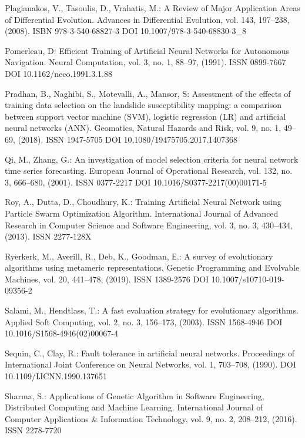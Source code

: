 \begin{thebibliography}{99.}
 Plagianakos, V., Tasoulis, D., Vrahatis, M.: A Review of Major Application Areas of Differential Evolution. Advances in Differential Evolution, vol. 143, 197--238, (2008). ISBN 978-3-540-68827-3 DOI 10.1007/978-3-540-68830-3\_8

 Pomerleau, D: Efficient Training of Artificial Neural Networks for Autonomous Navigation. Neural Computation, vol. 3, no. 1, 88--97, (1991). ISSN 0899-7667 DOI 10.1162/neco.1991.3.1.88

 Pradhan, B., Naghibi, S., Motevalli, A., Mansor, S: Assessment of the effects of training data selection on the landslide susceptibility mapping: a comparison between support vector machine (SVM), logistic regression (LR) and artificial neural networks (ANN). Geomatics, Natural Hazards and Risk, vol. 9, no. 1, 49--69, (2018). ISSN 1947-5705 DOI 10.1080/19475705.2017.1407368

 Qi, M., Zhang, G.: An investigation of model selection criteria for neural network time series forecasting. European Journal of Operational Research, vol. 132, no. 3, 666--680, (2001). ISSN 0377-2217 DOI 10.1016/S0377-2217(00)00171-5

 Roy, A., Dutta, D., Choudhury, K.: Training Artificial Neural Network using Particle Swarm Optimization Algorithm. International Journal of Advanced Research in Computer Science and Software Engineering, vol. 3, no. 3, 430--434, (2013). ISSN 2277-128X

 Ryerkerk, M., Averill, R., Deb, K., Goodman, Е.: A survey of evolutionary algorithms using metameric representations. Genetic Programming and Evolvable Machines, vol. 20, 441--478, (2019). ISSN 1389-2576 DOI 10.1007/s10710-019-09356-2

 Salami, M., Hendtlass, T.: A fast evaluation strategy for evolutionary algorithms. Applied Soft Computing, vol. 2, no. 3, 156--173, (2003). ISSN 1568-4946 DOI 10.1016/S1568-4946(02)00067-4

 Sequin, C., Clay, R.: Fault tolerance in artificial neural networks. Proceedings of International Joint Conference on Neural Networks, vol. 1, 703--708, (1990). DOI 10.1109/IJCNN.1990.137651

 Sharma, S.: Applications of Genetic Algorithm in Software Engineering, Distributed Computing and Machine Learning. International Journal of Computer Applications \& Information Technology, vol. 9, no. 2, 208--212, (2016). ISSN 2278-7720


\end{thebibliography}
